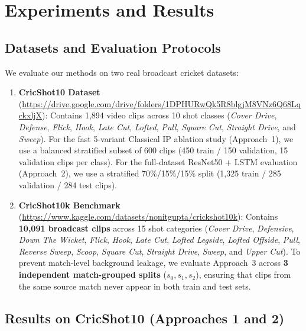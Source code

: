 \section{Experiments and Results}
\label{sec:experiments}

\subsection{Datasets and Evaluation Protocols}
We evaluate our methods on two real broadcast cricket datasets:
\begin{enumerate}
    \item \textbf{CricShot10 Dataset}~\cite{sen2021cricshot10} (\url{https://drive.google.com/drive/folders/1DPHURwQk5R8blgjM8VNz6Q68LqckxljX}): Contains 1,894 video clips across 10 shot classes (\textit{Cover Drive}, \textit{Defense}, \textit{Flick}, \textit{Hook}, \textit{Late Cut}, \textit{Lofted}, \textit{Pull}, \textit{Square Cut}, \textit{Straight Drive}, and \textit{Sweep}). For the fast 5-variant Classical IP ablation study (Approach~1), we use a balanced stratified subset of 600 clips (450 train / 150 validation, 15 validation clips per class). For the full-dataset ResNet50 + LSTM evaluation (Approach~2), we use a stratified 70\%/15\%/15\% split (1,325 train / 285 validation / 284 test clips).
    \item \textbf{CricShot10k Benchmark} (\url{https://www.kaggle.com/datasets/nonitgupta/crickshot10k}): Contains \textbf{10,091 broadcast clips} across 15 shot categories (\textit{Cover Drive}, \textit{Defensive}, \textit{Down The Wicket}, \textit{Flick}, \textit{Hook}, \textit{Late Cut}, \textit{Lofted Legside}, \textit{Lofted Offside}, \textit{Pull}, \textit{Reverse Sweep}, \textit{Scoop}, \textit{Square Cut}, \textit{Straight Drive}, \textit{Sweep}, and \textit{Upper Cut}). To prevent match-level background leakage, we evaluate Approach~3 across \textbf{3 independent match-grouped splits} ($s_0, s_1, s_2$), ensuring that clips from the same source match never appear in both train and test sets.
\end{enumerate}

\subsection{Results on CricShot10 (Approaches 1 and 2)}

